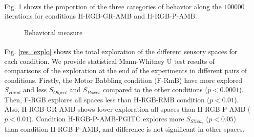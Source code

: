 \documentclass[10pt,letterpaper]{article}
\begin{document}
	\paragraph{}
	Fig. \ref{res_ow} shows the proportion of the three categories of behavior along the $100000$ iterations for conditions H-RGB-GR-AMB and H-RGB-P-AMB.

	\begin{figure}[ht]
		\centering
		\caption{Behavioral measure}
		\label{res_ow}
	\end{figure}


	\paragraph{}
	Fig. \ref{res_explo} shows the total exploration of the different sensory spaces for each condition.
	We provide statistical Mann-Whitney U test results of comparisons of the exploration at the end of the experiments in different pairs of conditions.
	Firstly, the Motor Babbling condition (F-RmB) have more explored $S_{Hand}$ and less $S_{Object}$ and $S_{Boxes}$ compared to the other conditions ($p<0.0001$).
	Then, F-RGB explores all spaces less than H-RGB-RMB condition ($p<0.01$).
	Also, H-RGB-GR-AMB shows lower exploration all spaces than H-RGB-P-AMB ($p<0.01$).
	Condition H-RGB-P-AMB-PGITC explores more $S_{Stick_2}$ ($p<0.05$) than condition H-RGB-P-AMB, and difference is not significant in other spaces.
	
\end{document}
